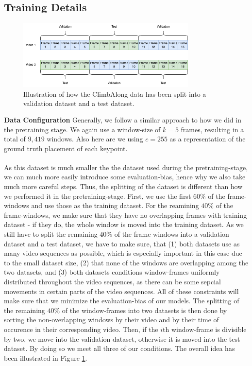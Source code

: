 \documentclass[./main.tex]{subfiles}
\begin{document}
\subsection{Training Details}
\begin{figure}[htbp]
    \centering
    \includegraphics[width=0.8\textwidth]{entities/CA_splitting.png}
    \caption{Illustration of how the ClimbAlong data has been split into a validation dataset and a test dataset.}
    \label{fig:CA_splitting}
\end{figure}
\noindent \textbf{Data Configuration} Generally, we follow a similar approach to how we did in the pretraining stage. We again use a window-size of $k = 5$ frames, resulting in a total of $9,419$ windows. Also here are we using $c = 255$ as a representation of the ground truth placement of each keypoint. 
\\
\\
As this dataset is much smaller the the dataset used during the pretraining-stage, we can much more easily introduce some evaluation-bias, hence why we also take much more careful steps. Thus, the splitting of the dataset is different than how we performed it in the pretraining-stage. First, we use the first $60\%$ of the frame-windows and use those as the training dataset. For the reamining $40\%$ of the frame-windows, we make sure that they have no overlapping frames with training dataset - if they do, the whole window is moved into the training dataset. As we still have to split the remaining $40\%$ of the frame-windows into a validation dataset and a test dataset, we have to make sure, that (1) both datasets use as many video sequences as possible, which is especially important in this case due to the small dataset size, (2) that none of the windows are overlapping among the two datasets, and (3) both datasets conditions window-frames uniformly distributed throughout the video sequences, as there can be some sepcial movements in certain parts of the video sequences. All of these constraints will make sure that we minimize the evaluation-bias of our models. The splitting of the remaining $40\%$ of the window-frames into two datasets is then done by sorting the non-overlapping windows by their video and by their time of occurence in their corresponding video. Then, if the $i$th window-frame is divisible by two, we move into the validation dataset, otherwise it is moved into the test dataset. By doing so we meet all three of our conditions. The overall idea has been illustrated in Figure \ref{fig:CA_splitting}.
\end{document}
